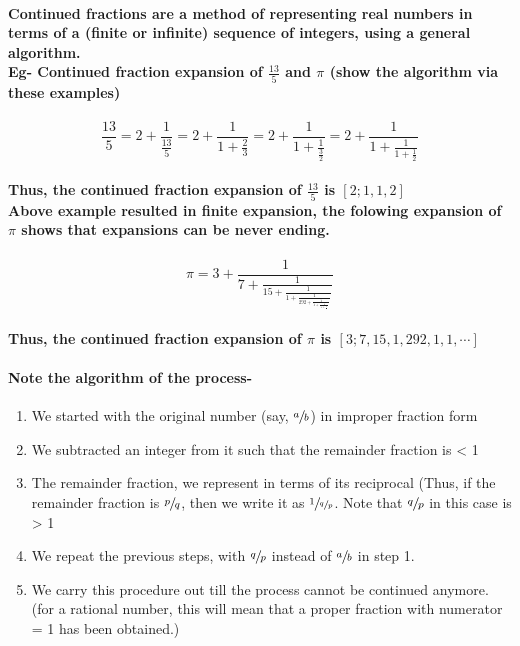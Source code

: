 \documentclass{report}
\begin{document}
\paragraph{Continued fractions are a method of representing real numbers in terms of a (finite or infinite) sequence of integers, using a general algorithm. \\ Eg- Continued fraction expansion of $\frac{13}{5}$ and $\pi$ (show the algorithm via these examples)}


\begin{displaymath}
{\frac{13}{5} = 2 + \frac{1}{\frac{13}{5}} = 2+ \frac{1}{1 + \frac{2}{3}} = 2+ \frac{1}{1 + \frac{1}{\frac{3}{2}}} = 2+ \frac{1}{1 + \frac{1}{1 + \frac{1}{2}}}}
\end{displaymath}

 
\paragraph{Thus, the continued fraction expansion of $\frac{13}{5}$ is $[2;1,1,2]$ \\ Above example resulted in finite expansion, the folowing expansion of $\pi$ shows that expansions can be never ending.}

\begin{displaymath}
{\pi = 3 + \frac{1}{7 + \frac{1}{15 + \frac{1}{1 + \frac{1}{292 + \frac{1}{1 + \frac{1}{1 + \frac{1}{\ddots}}}}}}}}
\end{displaymath}


\paragraph{Thus, the continued fraction expansion of $\pi$ is $[3; 7, 15, 1, 292, 1, 1,\cdots]$}

\paragraph{Note the algorithm of the process-}


\begin{enumerate}

\item  {We started with the original number (say, $\sfrac{a}{b}$) in improper fraction form}
\item  {We subtracted an integer from it such that the remainder fraction is < 1}
\item  {The remainder fraction, we represent in terms of its reciprocal (Thus, if the remainder fraction is $\sfrac{p}{q}$, then we write it as $\sfrac{1}{\sfrac{q}{p}}$. Note that $\sfrac{q}{p}$ in this case is > 1}
\item  {We repeat the previous steps, with $\sfrac{q}{p}$ instead of $\sfrac{a}{b}$ in step 1.}
\item  {We carry this procedure out till the process cannot be continued anymore. (for a rational number, this will mean that a proper fraction with numerator = 1 has been obtained.)}
\end{enumerate}
\end{document}
